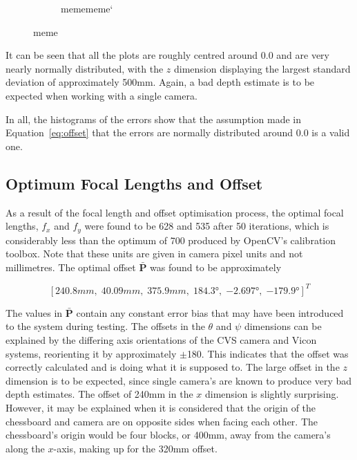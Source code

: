 \begin{figure}
\begin{subfigure}{0.45\textwidth}
     \caption{memememe`}
  \label{fig:norm-yaw}
  \end{subfigure}
  \caption{meme}
  \label{fig:err-norm}
\end{figure}

It can be seen that all the plots are roughly centred around 0.0 and are very nearly normally distributed, with the $z$ dimension displaying the largest standard deviation of approximately 500mm. Again, a bad depth estimate is to be expected when working with a single camera.

In all, the histograms of the errors show that the assumption made in Equation~\ref{eq:offset} that the errors are normally distributed around 0.0 is a valid one. 

\subsection{Optimum Focal Lengths and Offset}

As a result of the focal length and offset optimisation process, the optimal focal lengths, $f_x$ and $f_y$ were found to be 628 and 535 after 50 iterations, which is considerably less than the optimum of 700 produced by OpenCV's calibration toolbox. Note that these units are given in camera pixel units and not millimetres. The optimal offset $\bar{\bm{P}}$ was found to be approximately

\[
  [240.8mm, \; 40.09mm, \; 375.9mm, \; \ang{184.3}, \; \ang{-2.697}, \; \ang{-179.9}]^T
\]

The values in $\bar{\bm{P}}$ contain any constant error bias that may have been introduced to the system during testing. The offsets in the $\theta$ and $\psi$ dimensions can be explained by the differing axis orientations of the CVS camera and Vicon systems, reorienting it by approximately $\pm$180\degree. This indicates that the offset was correctly calculated and is doing what it is supposed to. The large offset in the $z$ dimension is to be expected, since single camera's are known to produce very bad depth estimates. The offset of 240mm in the $x$ dimension is slightly surprising. However, it may be explained when it is considered that the origin of the chessboard and camera are on opposite sides when facing each other. The chessboard's origin would be four blocks, or 400mm, away from the camera's along the $x$-axis, making up for the 320mm offset.

